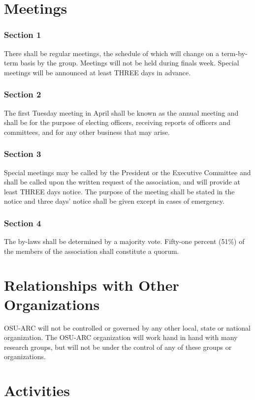 \documentclass[10pt,letterpaper]{article}
\begin{document}
\part{Meetings}

\section*{Section 1} There shall be regular meetings, the schedule of which will change on a term-by-term basis by the group. Meetings will not be held during finals week. Special meetings will be announced at least THREE days in advance.
\section*{Section 2} The first Tuesday meeting in April shall be known as the annual meeting and shall be for the purpose of electing officers, receiving reports of officers and committees, and for any other business that may arise.
\section*{Section 3 } Special meetings may be called by the President or the Executive Committee and shall be called upon the written request of the association, and will provide at least THREE days notice. The purpose of the meeting shall be stated in the notice and three days' notice shall be given except in cases of emergency.
\section*{Section 4} The by-laws shall be determined by a majority vote. Fifty-one percent (51\%) of the members of the association shall constitute a quorum.

\part{Relationships with Other Organizations}

OSU-ARC will not be controlled or governed by any other local, state or national organization. The OSU-ARC organization will work hand in hand with many research groups, but will not be under the control of any of these groups or organizations.

\part{Activities}
\end{document}
